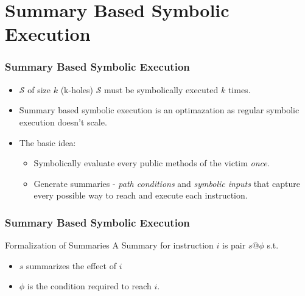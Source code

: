 \documentclass{beamer}
\begin{document}
\section{Summary Based Symbolic Execution}
\begin{frame}
  \frametitle{Summary Based Symbolic Execution}
  \begin{itemize}
    \item $\mathcal{S}$ of size $k$ (k-holes)
      $\mathcal{S}$ must be symbolically executed $k$ times.
    \item Summary based symbolic execution is an optimazation
      as regular symbolic execution doesn't scale.
    \item The basic idea:
      \begin{itemize}
        \item Symbolically evaluate every public methods of
          the victim \textit{once}.
        \item Generate summaries - \textit{path conditions} and
          \textit{symbolic inputs} that capture every possible
          way to reach and execute each instruction.
       \end{itemize}
      \end{itemize}
\end{frame}

\begin{frame}
  \frametitle{Summary Based Symbolic Execution}
  \begin{block}{Formalization of Summaries}
    A Summary for instruction $i$ is pair $s@\phi$ s.t.
    \begin{itemize}
      \item $s$ summarizes the effect of $i$
      \item $\phi$ is the condition required to reach $i$.
    \end{itemize}
  \end{block}
\end{frame}
\end{document}
